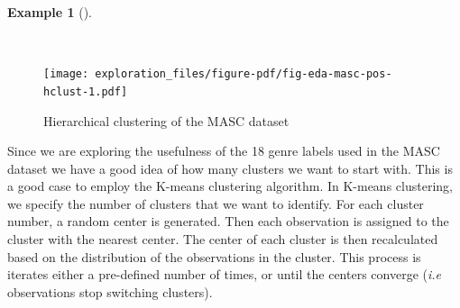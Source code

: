 \documentclass[
  letterpaper,
  DIV=11,
  numbers=noendperiod]{scrreport}
\newenvironment{Shaded}{\begin{snugshade}}{\end{snugshade}}
\newcommand{\AttributeTok}[1]{\textcolor[rgb]{0.00,0.00,0.00}{#1}}
\newcommand{\CommentTok}[1]{\textcolor[rgb]{0.00,0.00,0.00}{\textit{#1}}}
\newcommand{\ConstantTok}[1]{\textcolor[rgb]{0.00,0.00,0.00}{#1}}
\newcommand{\DecValTok}[1]{\textcolor[rgb]{0.00,0.00,0.00}{#1}}
\newcommand{\FunctionTok}[1]{\textcolor[rgb]{0.00,0.00,0.00}{#1}}
\newcommand{\NormalTok}[1]{\textcolor[rgb]{0.00,0.00,0.00}{#1}}
\newcommand{\OtherTok}[1]{\textcolor[rgb]{0.00,0.00,0.00}{#1}}
\newcommand{\SpecialCharTok}[1]{\textcolor[rgb]{0.00,0.00,0.00}{#1}}
\newcommand{\StringTok}[1]{\textcolor[rgb]{0.00,0.00,0.00}{#1}}
\theoremstyle{definition}
\newtheorem{example}{Example}[chapter]
\theoremstyle{remark}
\begin{document}
\begin{example}[]\protect\hypertarget{exm-eda-masc-pos-hclust}{}\label{exm-eda-masc-pos-hclust}

~

\begin{Shaded}
\end{Shaded}

\begin{figure}[H]

{\centering \texttt{[image: exploration\_files/figure-pdf/fig-eda-masc-pos-hclust-1.pdf]}

}

\caption{\label{fig-eda-masc-pos-hclust}Hierarchical clustering of the
MASC dataset}

\end{figure}

\end{example}

Since we are exploring the usefulness of the 18 genre labels used in the
MASC dataset we have a good idea of how many clusters we want to start
with. This is a good case to employ the K-means clustering algorithm. In
K-means clustering, we specify the number of clusters that we want to
identify. For each cluster number, a random center is generated. Then
each observation is assigned to the cluster with the nearest center. The
center of each cluster is then recalculated based on the distribution of
the observations in the cluster. This process is iterates either a
pre-defined number of times, or until the centers converge (\emph{i.e}
observations stop switching clusters).
\end{document}
